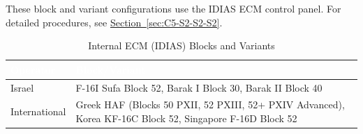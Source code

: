 \documentclass[11pt, a4paper, twoside]{report}
\newcommand{\secref}[1]{\hyperref[#1]{Section~\ref*{#1}}}
\begin{document}
These block and variant configurations use the IDIAS ECM control panel. For detailed procedures, see \secref{sec:C5-S2-S2-S2}.

\begin{table}[H]
\centering
\caption{Internal ECM (IDIAS) Blocks and Variants}
\label{tab:C5-S3-internal-ecm}
\small
\renewcommand{\arraystretch}{1.25}
\begin{tabular}{|>{\raggedright\arraybackslash}p{3.0cm}|>{\raggedright\arraybackslash}p{5.8cm}|}
\hline
\rowcolor{headerblue}
\textcolor{white}{\textbf{Operator}} & \textcolor{white}{\textbf{Block/Variant}} \\
\hline
Israel & F-16I Sufa Block 52, Barak I Block 30, Barak II Block 40 \\
\hline
International & Greek HAF (Blocks 50 PXII, 52 PXIII, 52+ PXIV Advanced),
Korea KF-16C Block 52, Singapore F-16D Block 52 \\
\hline
\end{tabular}
\end{table}

\end{document}
